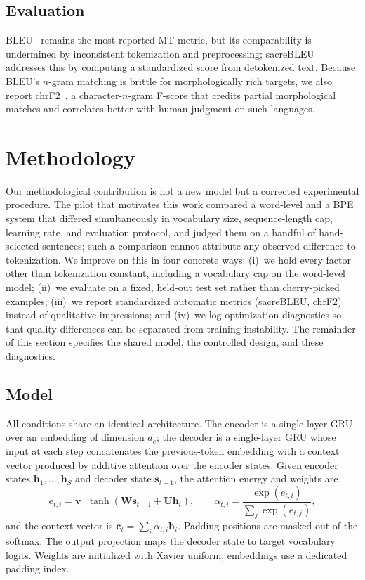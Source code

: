 \documentclass[conference]{IEEEtran}
\begin{document}
\subsection{Evaluation}
BLEU~\cite{papineni2002} remains the most reported MT metric, but its
comparability is undermined by inconsistent tokenization and preprocessing;
sacreBLEU~\cite{post2018} addresses this by computing a standardized score from
detokenized text. Because BLEU's $n$-gram matching is brittle for
morphologically rich targets, we also report chrF2~\cite{popovic2015}, a
character-$n$-gram F-score that credits partial morphological matches and
correlates better with human judgment on such languages.

\section{Methodology}
Our methodological contribution is not a new model but a corrected experimental
procedure. The pilot that motivates this work compared a word-level and a BPE
system that differed simultaneously in vocabulary size, sequence-length cap,
learning rate, and evaluation protocol, and judged them on a handful of
hand-selected sentences; such a comparison cannot attribute any observed
difference to tokenization. We improve on this in four concrete ways: (i)~we hold
every factor other than tokenization constant, including a vocabulary cap on the
word-level model; (ii)~we evaluate on a fixed, held-out test set rather than
cherry-picked examples; (iii)~we report standardized automatic metrics
(sacreBLEU, chrF2) instead of qualitative impressions; and (iv)~we log
optimization diagnostics so that quality differences can be separated from
training instability. The remainder of this section specifies the shared model,
the controlled design, and these diagnostics.

\subsection{Model}
All conditions share an identical architecture. The encoder is a single-layer
GRU over an embedding of dimension $d_e$; the decoder is a single-layer GRU
whose input at each step concatenates the previous-token embedding with a
context vector produced by additive attention over the encoder states. Given
encoder states $\mathbf{h}_1,\dots,\mathbf{h}_S$ and decoder state
$\mathbf{s}_{t-1}$, the attention energy and weights are
\begin{equation}
e_{t,i} = \mathbf{v}^\top \tanh(\mathbf{W}\mathbf{s}_{t-1} + \mathbf{U}\mathbf{h}_i),
\qquad
\alpha_{t,i} = \frac{\exp(e_{t,i})}{\sum_{j} \exp(e_{t,j})},
\end{equation}
and the context vector is
$\mathbf{c}_t = \sum_i \alpha_{t,i}\mathbf{h}_i$. Padding positions are masked
out of the softmax. The output projection maps the decoder state to target
vocabulary logits. Weights are initialized with Xavier uniform; embeddings use a
dedicated padding index.
\end{document}
